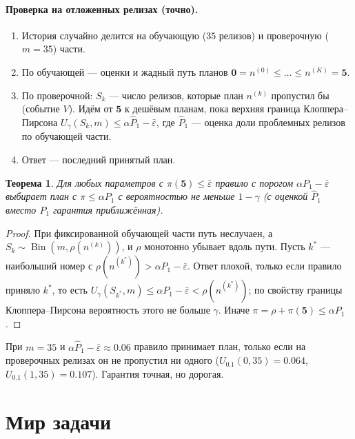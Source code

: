 \documentclass[11pt,a4paper]{article}
\newcommand{\Bin}{\operatorname{Bin}}
\theoremstyle{plain}
\newtheorem{theorem}{Теорема}
\theoremstyle{definition}
\begin{document}
\paragraph{Проверка на отложенных релизах (точно).}
\begin{enumerate}
\item История случайно делится на обучающую ($35$ релизов) и проверочную ($m=35$) части.
\item По обучающей --- оценки и жадный путь планов $\mathbf0=n^{(0)}\le\dots\le n^{(K)}=\mathbf5$.
\item По проверочной: $S_k$ --- число релизов, которые план $n^{(k)}$ пропустил бы (событие $V$). Идём от $\mathbf5$ к дешёвым планам, пока верхняя граница Клоппера--Пирсона $U_\gamma(S_k,m)\le\alpha\hat P_1-\bar\varepsilon$, где $\hat P_1$ --- оценка доли проблемных релизов по обучающей части.
\item Ответ --- последний принятый план.
\end{enumerate}

\begin{theorem}
Для любых параметров с $\pi(\mathbf5)\le\bar\varepsilon$ правило с порогом $\alpha P_1-\bar\varepsilon$ выбирает план с $\pi\le\alpha P_1$ с вероятностью не меньше $1-\gamma$ (с оценкой $\hat P_1$ вместо $P_1$ гарантия приближённая).
\end{theorem}

\begin{proof}
При фиксированной обучающей части путь неслучаен, а $S_k\sim\Bin(m,\rho(n^{(k)}))$, и $\rho$ монотонно убывает вдоль пути. Пусть $k^*$ --- наибольший номер с $\rho(n^{(k^*)})>\alpha P_1-\bar\varepsilon$. Ответ плохой, только если правило приняло $k^*$, то есть $U_\gamma(S_{k^*},m)\le\alpha P_1-\bar\varepsilon<\rho(n^{(k^*)})$; по свойству границы Клоппера--Пирсона вероятность этого не больше $\gamma$. Иначе $\pi=\rho+\pi(\mathbf5)\le\alpha P_1$.
\end{proof}

При $m=35$ и $\alpha\hat P_1-\bar\varepsilon\approx0.06$ правило принимает план, только если на проверочных релизах он не пропустил ни одного ($U_{0.1}(0,35)=0.064$, $U_{0.1}(1,35)=0.107$). Гарантия точная, но дорогая.

\section{Мир задачи}
\end{document}
